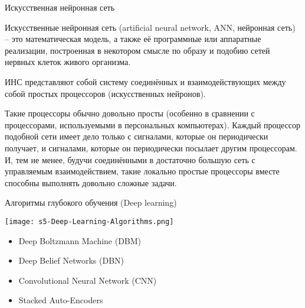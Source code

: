 \documentclass[pdf, intlimits, 9pt, unicode]{beamer}
\begin{document}
\begin{frame}{Искусственная нейронная сеть}

\small

Искусственные нейронная сеть (artificial neural network, ANN, нейронная сеть) -- это математическая модель, а также её программные или аппаратные реализации, построенная в некотором смысле по образу и подобию сетей нервных клеток живого организма.\pause

{\color{red}ИНС} представляют собой систему соединённых и взаимодействующих между собой простых процессоров (искусственных нейронов). \pause

Такие процессоры обычно довольно просты (особенно в сравнении с процессорами, используемыми в персональных компьютерах). \pause Каждый процессор подобной сети имеет дело только с сигналами, которые он периодически получает, и сигналами, которые он периодически посылает другим процессорам. \pause И, тем не менее, будучи соединёнными в достаточно большую сеть с управляемым взаимодействием, такие локально простые процессоры вместе способны выполнять довольно сложные задачи.

\end{frame}



\begin{frame}{Алгоритмы глубокого обучения (Deep learning)}

\begin{center}\texttt{[image: s5-Deep-Learning-Algorithms.png]}\end{center}

\begin{itemize}
\item Deep Boltzmann Machine (DBM)
\item Deep Belief Networks (DBN)
\item Convolutional Neural Network (CNN)
\item Stacked Auto-Encoders
\end{itemize}

\end{frame}




\end{document}

